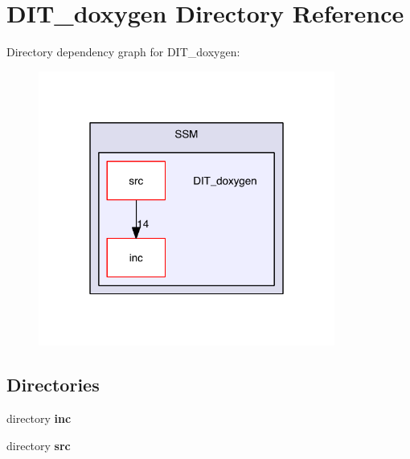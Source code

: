 \section{D\-I\-T\-\_\-doxygen Directory Reference}
\label{dir_eaec92d7896823c82d2bba1199e530bd}
Directory dependency graph for D\-I\-T\-\_\-doxygen\-:\nopagebreak
\begin{figure}[H]
\begin{center}
\leavevmode
\includegraphics[width=276pt]{dir_eaec92d7896823c82d2bba1199e530bd_dep}
\end{center}
\end{figure}
\subsection*{Directories}
\begin{DoxyCompactItemize}
\item 
directory {\bf inc}
\item 
directory {\bf src}
\end{DoxyCompactItemize}
